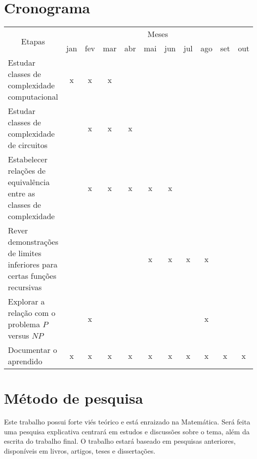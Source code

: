 \documentclass[12pt]{article}
\begin{document}
\section{Cronograma}

    \begin{tabularx}{\linewidth}{|X|*{10}{c|}}
        \hline
        \multicolumn{1}{|c|}{\multirow{2}{*}{Etapas}} & \multicolumn{10}{|c|}{Meses}\\ \cline{2-11}
        & jan & fev & mar & abr & mai & jun & jul & ago & set & out \\ \hline

        Estudar classes de complexidade computacional
        &  x  &  x  &  x  &     &     &     &     &     &     &     \\ \hline

        Estudar classes de complexidade de circuitos
        &     &  x  &  x  &  x  &     &     &     &     &     &     \\ \hline

        Estabelecer relações de equivalência entre as classes de complexidade
        &     &  x  &  x  &  x  &  x  &  x  &     &     &     &     \\ \hline

        Rever demonstrações de limites inferiores para certas funções recursivas
        &     &     &     &     &  x  &  x  &  x  &  x  &     &     \\ \hline

        Explorar a relação com o problema $P$ versus $NP$
        &     &  x  &     &     &     &     &     &  x  &     &     \\ \hline

        Documentar o aprendido
        &  x  &  x  &  x  &  x  &  x  &  x  &  x  &  x  &  x  &  x  \\ \hline

    \end{tabularx}

\section{Método de pesquisa}

    Este trabalho possui forte viés teórico e está enraizado na Matemática.
    Será feita uma pesquisa explicativa centrará em estudos e discussões sobre o tema,
    além da escrita do trabalho final.
    O trabalho estará baseado em pesquisas anteriores,
    disponíveis em livros, artigos, teses e dissertações.
\end{document}
